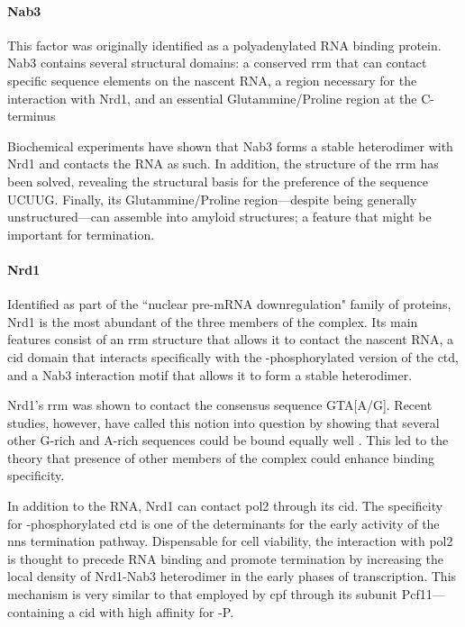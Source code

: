 \paragraph{Nab3}

This factor was originally identified as a polyadenylated RNA binding protein.
Nab3 contains several structural domains: a conserved \gls{rrm} that can contact specific sequence elements on the nascent RNA, a region necessary for the interaction with Nrd1, and an essential Glutammine/Proline region at the C-terminus

Biochemical experiments have shown that Nab3 forms a stable heterodimer with Nrd1 and contacts the RNA as such. 
In addition, the structure of the \gls{rrm} has been solved, revealing the structural basis for the preference of the sequence UCUUG.
Finally, its Glutammine/Proline region---despite being generally unstructured---can assemble into amyloid structures; a feature that might be important for termination.


\paragraph{Nrd1}

Identified as part of the ``nuclear pre-mRNA downregulation" family of proteins, Nrd1 is the most abundant of the three members of the complex.
Its main features consist of an \gls{rrm} structure that allows it to contact the nascent RNA, a \gls{cid} domain that interacts specifically with the \serf{}-phosphorylated version of the \gls{ctd}, and a Nab3 interaction motif that allows it to form a stable heterodimer.

Nrd1's \gls{rrm} was shown \invivo{} to contact the consensus sequence GTA[A/G].
Recent \invitro{} studies, however, have called this notion into question by showing that several other G-rich and A-rich sequences could be bound equally well \cite{bacikova:2014:structure}.
This led to the theory that presence of other members of the complex could enhance binding specificity.

In addition to the RNA, Nrd1 can contact \gls{pol2} through its \gls{cid}. 
The specificity for \serf{}-phosphorylated \gls{ctd} is one of the determinants for the early activity of the \gls{nns} termination pathway. 
Dispensable for cell viability, the interaction with \gls{pol2} is thought to precede RNA binding and promote termination by increasing the local density of Nrd1-Nab3 heterodimer in the early phases of transcription.
This mechanism is very similar to that employed by \gls{cpf} through its subunit Pcf11---containing a \gls{cid} with high affinity for \sert{}-P.
 

